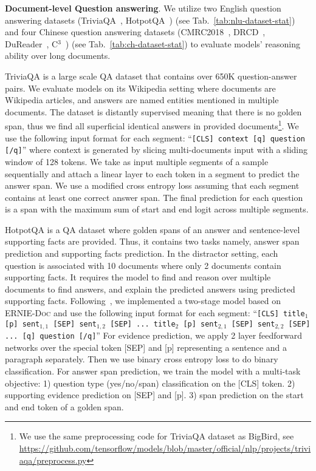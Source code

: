 \documentclass[11pt,a4paper]{article}
\newcommand{\mname}{\textsc{ERNIE-Doc}\xspace}
\begin{document}
\noindent \textbf{Document-level Question answering}. We utilize two English question answering datasets (TriviaQA~\citep{joshi2017triviaqa}, HotpotQA~\citep{yang2018hotpotqa}) (see Tab.~\ref{tab:nlu-dataset-stat}) and four Chinese question answering datasets (CMRC2018~\citep{cmrc2018}, DRCD~\citep{drcd}, DuReader~\citep{dureader}, C$^3$~\citep{c3}) (see Tab.~\ref{tab:ch-dataset-stat}) to evaluate models' reasoning ability over long documents. 

TriviaQA is a large scale QA dataset that contains over 650K question-answer pairs. We evaluate models on its Wikipedia setting where documents are Wikipedia articles, and answers are named entities mentioned in multiple documents. The dataset is distantly supervised meaning that there is no golden span, thus we find all superficial identical answers in provided documents\footnote{We use the same preprocessing code for TriviaQA dataset as BigBird, see \url{https://github.com/tensorflow/models/blob/master/official/nlp/projects/triviaqa/preprocess.py}}. We use the following input format for each segment: ``\texttt{[CLS] context [q] question [/q]}'' where context is generated by slicing multi-documents input with a sliding window of 128 tokens. We take as input multiple segments of a sample sequentially and attach a linear layer to each token in a segment to predict the answer span. We use a modified cross entropy loss \citep{clark2017simple} assuming that each segment contains at least one correct answer span. The final prediction for each question is a span with the maximum sum of start and end logit across multiple segments. 

HotpotQA is a QA dataset where golden spans of an answer and sentence-level supporting facts are provided. Thus, it contains two tasks namely, answer span prediction and supporting facts prediction. In the distractor setting, each question is associated with 10 documents where only 2 documents contain supporting facts. It requires the model to find and reason over multiple documents to find answers, and explain the predicted answers using predicted supporting facts. Following~\citet{groeneveld2020simple}, we implemented a two-stage model based on \mname and use the following input format for each segment: ``\texttt{[CLS] title$_1$ [p] sent$_{1,1}$ [SEP] sent$_{1,2}$ [SEP] ... title$_2$ [p] sent$_{2,1}$ [SEP] sent$_{2,2}$ [SEP] ... [q] question [/q]}'' For evidence prediction, we apply 2 layer feedforward networks over the special token [SEP] and [p] representing a sentence and a paragraph separately. Then we use binary cross entropy loss to do binary classification. For answer span prediction, we train the model with a multi-task objective: 1) question type (yes/no/span) classification on the [CLS] token. 2) supporting evidence prediction on [SEP] and [p]. 3) span prediction on the start and end token of a golden span.
\end{document}
